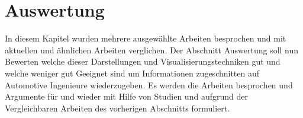 \documentclass[draft=false
              ,paper=a4
              ,twoside=false
              ,fontsize=11pt
              ,headsepline
              ,BCOR10mm
              ,DIV11
              ]{scrbook}
\newcommand{\TODO}[1]{\colorbox{yellow}{\textcolor{red}{[TODO: #1]}}}
\begin{document}
\section{Auswertung} %
\label{sec:auswertung}
In diesem Kapitel wurden mehrere ausgewählte Arbeiten besprochen und mit aktuellen und ähnlichen Arbeiten verglichen. Der Abschnitt Auswertung soll nun Bewerten welche dieser Darstellungen und Visualisierungstechniken gut und welche weniger gut Geeignet sind um Informationen zugeschnitten auf Automotive Ingenieure wiederzugeben. Es werden die Arbeiten besprochen und Argumente für und wieder mit Hilfe von Studien und aufgrund der Vergleichbaren Arbeiten des vorherigen Abschnitts formuliert.
\end{document}
